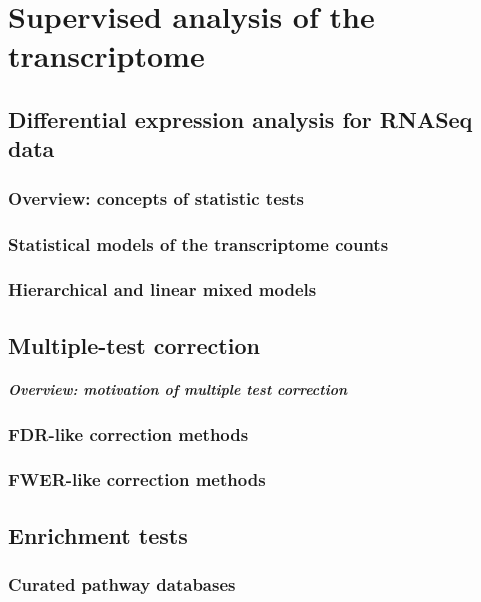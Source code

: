 \chapter{Supervised analysis of the transcriptome}

\section{Differential expression analysis for RNASeq data}
\subsection{Overview: concepts of statistic tests}
\subsection{Statistical models of the transcriptome counts}
\subsection{Hierarchical and linear mixed models}




\section{Multiple-test correction}
\paragraph{Overview: motivation of multiple test correction}
\subsection{FDR-like correction methods}
\subsection{FWER-like correction methods}

\section{Enrichment tests}
\subsection{Curated pathway databases}

